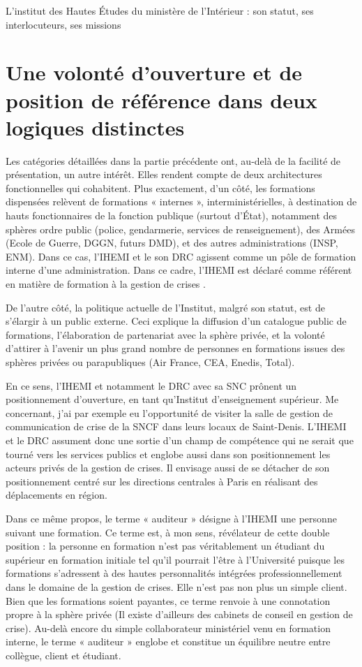 \documentclass[10pt,a4paper]{report} %
\begin{document}
\begin{part}{L’institut des Hautes Études du ministère de l’Intérieur : son statut, ses interlocuteurs, ses missions}
\section{Une volonté d’ouverture et de position de référence dans deux logiques distinctes}
Les catégories détaillées dans la partie précédente ont, au-delà de la facilité de présentation, un autre intérêt. Elles rendent compte de deux architectures fonctionnelles qui cohabitent. Plus exactement, d’un côté, les formations dispensées relèvent de formations « internes », interministérielles, à destination de hauts fonctionnaires de la fonction publique (surtout d’État), notamment des sphères ordre public (police, gendarmerie, services de renseignement), des Armées (Ecole de Guerre, DGGN, futurs DMD), et des autres administrations (INSP, ENM). Dans ce cas, l’IHEMI et le son DRC agissent comme un pôle de formation interne d’une administration. Dans ce cadre, l’IHEMI est déclaré comme référent en matière de formation à la gestion de crises \parencite{livreblanc}.

De l’autre côté, la politique actuelle de l’Institut, malgré son statut, est de s’élargir à un public externe. Ceci explique la diffusion d’un catalogue public de formations, l’élaboration de partenariat avec la sphère privée, et la volonté d’attirer à l’avenir un plus grand nombre de personnes en formations issues des sphères privées ou parapubliques (Air France, CEA, Enedis, Total). 

En ce sens, l’IHEMI et notamment le DRC avec sa SNC prônent un positionnement d’ouverture, en tant qu’Institut d’enseignement supérieur. Me concernant, j’ai par exemple eu l’opportunité de visiter la salle de gestion de communication de crise de la SNCF dans leurs locaux de Saint-Denis. L’IHEMI et le DRC assument donc une sortie d’un champ de compétence qui ne serait que tourné vers les services publics et englobe aussi dans son positionnement les acteurs privés de la gestion de crises. Il envisage aussi de se détacher de son positionnement centré sur les directions centrales à Paris en réalisant des déplacements en région.

Dans ce même propos, le terme « auditeur » désigne à l’IHEMI une personne suivant une formation. Ce terme est, à mon sens, révélateur de cette double position : la personne en formation n’est pas véritablement un étudiant du supérieur en formation initiale tel qu’il pourrait l’être à l’Université puisque les formations s’adressent à des hautes personnalités intégrées professionnellement dans le domaine de la gestion de crises. Elle n’est pas non plus un simple client. Bien que les formations soient payantes, ce terme renvoie à une connotation propre à la sphère privée (Il existe d’ailleurs des cabinets de conseil en gestion de crise). Au-delà encore du simple collaborateur ministériel venu en formation interne, le terme « auditeur » englobe et constitue un équilibre neutre entre collègue, client et étudiant.



\end{part}
\end{document}
